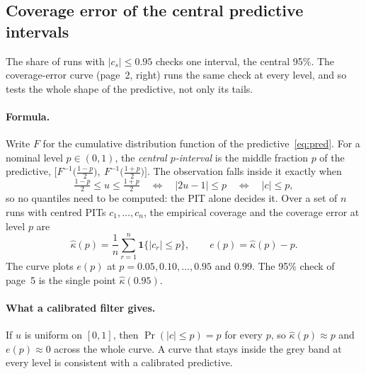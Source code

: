 \documentclass[11pt]{article}
\begin{document}
\subsection{Coverage error of the central predictive intervals}
\label{sec:coverage}

The share of runs with $|c_s| \le 0.95$ checks one interval, the central 95\%. The
coverage-error curve (page~2, right) runs the same check at every level, and so tests
the whole shape of the predictive, not only its tails.

\paragraph{Formula.} Write $F$ for the cumulative distribution function of the
predictive~\eqref{eq:pred}. For a nominal level $p \in (0, 1)$, the \emph{central
$p$-interval} is the middle fraction $p$ of the predictive,
$\big[F^{-1}\big(\tfrac{1-p}{2}\big),\ F^{-1}\big(\tfrac{1+p}{2}\big)\big]$. The
observation falls inside it exactly when
\[
  \tfrac{1-p}{2} \le u \le \tfrac{1+p}{2}
  \quad\Longleftrightarrow\quad |2u - 1| \le p
  \quad\Longleftrightarrow\quad |c| \le p ,
\]
so no quantiles need to be computed: the PIT alone decides it. Over a set of $n$ runs
with centred PITs $c_1, \dots, c_n$, the empirical coverage and the coverage error at
level $p$ are
\[
  \hat\kappa(p) = \frac{1}{n}\sum_{r=1}^{n} \mathbf{1}\{|c_r| \le p\}, \qquad
  e(p) = \hat\kappa(p) - p .
\]
The curve plots $e(p)$ at $p = 0.05, 0.10, \dots, 0.95$ and $0.99$. The 95\% check of
page~5 is the single point $\hat\kappa(0.95)$.

\paragraph{What a calibrated filter gives.} If $u$ is uniform on $[0,1]$, then
$\Pr(|c| \le p) = p$ for every $p$, so $\hat\kappa(p) \approx p$ and $e(p) \approx 0$
across the whole curve. A curve that stays inside the grey band at every level is
consistent with a calibrated predictive.
\end{document}
